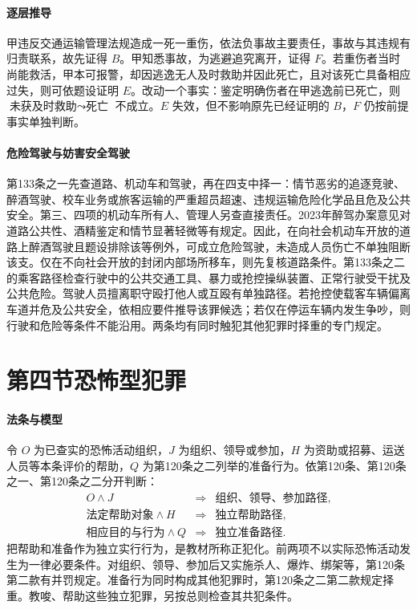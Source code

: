 \paragraph{逐层推导}
甲违反交通运输管理法规造成一死一重伤，依法负事故主要责任，事故与其违规有归责联系，故先证得 $B$。甲知悉事故，为逃避追究离开，证得 $F$。若重伤者当时尚能救活，甲本可报警，却因逃逸无人及时救助并因此死亡，且对该死亡具备相应过失，则可依题设证明 $E$。改动一个事实：鉴定明确伤者在甲逃逸前已死亡，则 $\text{未获及时救助}\leadsto\text{死亡}$ 不成立。$E$ 失效，但不影响原先已经证明的 $B$，$F$ 仍按前提事实单独判断。

\paragraph{危险驾驶与妨害安全驾驶}
第133条之一先查道路、机动车和驾驶，再在四支中择一：情节恶劣的追逐竞驶、醉酒驾驶、校车业务或旅客运输的严重超员超速、违规运输危险化学品且危及公共安全。第三、四项的机动车所有人、管理人另查直接责任。2023年醉驾办案意见对道路公共性、酒精鉴定和情节显著轻微等有规定。因此，在向社会机动车开放的道路上醉酒驾驶且题设排除该等例外，可成立危险驾驶，未造成人员伤亡不单独阻断该支。仅在不向社会开放的封闭内部场所移车，则先复核道路条件。第133条之二的乘客路径检查行驶中的公共交通工具、暴力或抢控操纵装置、正常行驶受干扰及公共危险。驾驶人员擅离职守殴打他人或互殴有单独路径。若抢控使载客车辆偏离车道并危及公共安全，依相应要件推导该罪候选；若仅在停运车辆内发生争吵，则行驶和危险等条件不能沿用。两条均有同时触犯其他犯罪时择重的专门规定。

\section{第四节\quad 恐怖型犯罪}

\paragraph{法条与模型}
令 $O$ 为已查实的恐怖活动组织，$J$ 为组织、领导或参加，$H$ 为资助或招募、运送人员等本条评价的帮助，$Q$ 为第120条之二列举的准备行为。依第120条、第120条之一、第120条之二分开判断：
\[
 \begin{array}{ccl}
 O\land J&\Longrightarrow&\text{组织、领导、参加路径},\\
 \text{法定帮助对象}\land H&\Longrightarrow&\text{独立帮助路径},\\
 \text{相应目的与行为}\land Q&\Longrightarrow&\text{独立准备路径}.
 \end{array}
\]
把帮助和准备作为独立实行行为，是教材所称正犯化。前两项不以实际恐怖活动发生为一律必要条件。对组织、领导、参加后又实施杀人、爆炸、绑架等，第120条第二款有并罚规定。准备行为同时构成其他犯罪时，第120条之二第二款规定择重。教唆、帮助这些独立犯罪，另按总则检查其共犯条件。


